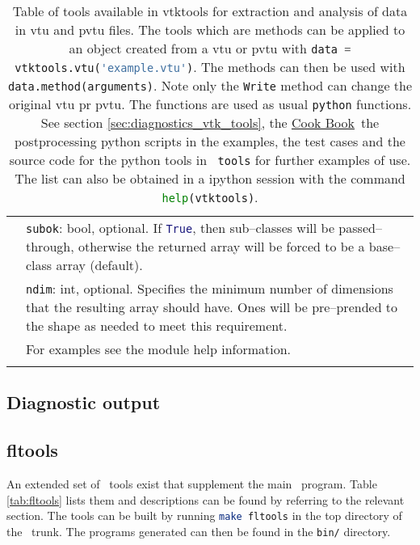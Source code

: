 \begin{landscape}
\begin{longtable}{|c | p{} |p{}|}
& \multicolumn{2}{p{1.05\textwidth}|}{\lstinline[language=Python]+subok+: bool, optional. If \lstinline[language=Python]+True+, then sub--classes will be passed--through, otherwise the returned array will be forced to be a base--class array (default).} \\ 
& \multicolumn{2}{p{1.05\textwidth}|}{\lstinline[language=Python]+ndim+: int, optional. Specifies the minimum number of dimensions that the resulting array should have. Ones will be pre--prended to the shape as needed to meet this requirement.} \\
& \multicolumn{2}{p{1.05\textwidth}|}{For examples see the module help information.} \\ \hline

%
%
%
\caption[Table of vtktools]{Table of tools available in vtktools for extraction and analysis of data in vtu and pvtu files. The tools which are methods can be applied to an object created from a vtu or pvtu with \lstinline[language=Python]+data = vtktools.vtu('example.vtu')+. The methods can then be used with \lstinline[language=Python]+data.method(arguments)+. Note only the \lstinline[language=Python]+Write+ method can change the original vtu pr pvtu. The functions are used as usual \lstinline[language=Python]+python+ functions. See section \ref{sec:diagnostics_vtk_tools}, the \href{http://amcg.ese.ic.ac.uk/index.php?title=Cook_Book}{Cook Book}\, the postprocessing python scripts in the examples, the test cases and the source code for the python tools in \lstinline[language = bash]+ tools+ for further examples of use. The list can also be obtained in a ipython session with the command \lstinline[language=Python]+help(vtktools)+.}
\label{table:vtktools_list}
\end{longtable}
\end{landscape}

\subsection{Diagnostic output}
\label{sec:diagnostic_output}

\subsection{fltools}
\label{sec:fltools}
An extended set of \fluidity\ tools exist that supplement the main
\fluidity\ program. Table \ref{tab:fltools} lists them and descriptions can
be found by referring to the relevant section. The tools can be built by
running \lstinline[language = bash]+make fltools+ in the top directory of
the \fluidity\ trunk. The programs generated can then be found in the
\lstinline[language = bash]+bin/+ directory.

